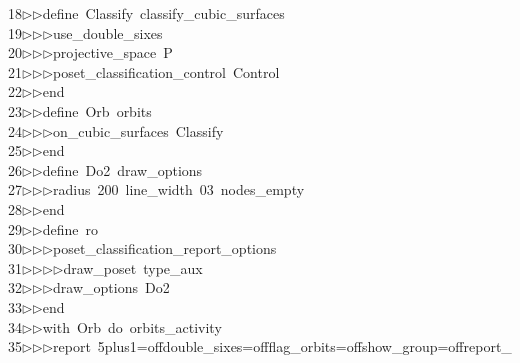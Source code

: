 \begin{tabbing}
18\>$\triangleright$\>$\triangleright$\>define\ Classify\ classify\_cubic\_surfaces\ \\[0pt]
19\>$\triangleright$\>$\triangleright$\>$\triangleright$\>use\_double\_sixes\ \\[0pt]
20\>$\triangleright$\>$\triangleright$\>$\triangleright$\>projective\_space\ P\ \\[0pt]
21\>$\triangleright$\>$\triangleright$\>$\triangleright$\>poset\_classification\_control\ Control\ \\[0pt]
22\>$\triangleright$\>$\triangleright$\>end\ \\[0pt]
23\>$\triangleright$\>$\triangleright$\>define\ Orb\ orbits\ \\[0pt]
24\>$\triangleright$\>$\triangleright$\>$\triangleright$\>on\_cubic\_surfaces\ Classify\ \\[0pt]
25\>$\triangleright$\>$\triangleright$\>end\ \\[0pt]
26\>$\triangleright$\>$\triangleright$\>define\ Do2\ draw\_options\ \\[0pt]
27\>$\triangleright$\>$\triangleright$\>$\triangleright$\>radius\ 200\ line\_width\ 03\ nodes\_empty\ \\[0pt]
28\>$\triangleright$\>$\triangleright$\>end\ \\[0pt]
29\>$\triangleright$\>$\triangleright$\>define\ ro\ \\[0pt]
30\>$\triangleright$\>$\triangleright$\>$\triangleright$\>poset\_classification\_report\_options\ \\[0pt]
31\>$\triangleright$\>$\triangleright$\>$\triangleright$\>$\triangleright$\>draw\_poset\ type\_aux\ \\[0pt]
32\>$\triangleright$\>$\triangleright$\>$\triangleright$\>draw\_options\ Do2\ \\[0pt]
33\>$\triangleright$\>$\triangleright$\>end\ \\[0pt]
34\>$\triangleright$\>$\triangleright$\>with\ Orb\ do\ orbits\_activity\ \\[0pt]
35\>$\triangleright$\>$\triangleright$\>$\triangleright$\>report\ 5plus1=offdouble\_sixes=offflag\_orbits=offshow\_group=offreport\_\\[0pt]

\end{tabbing}
